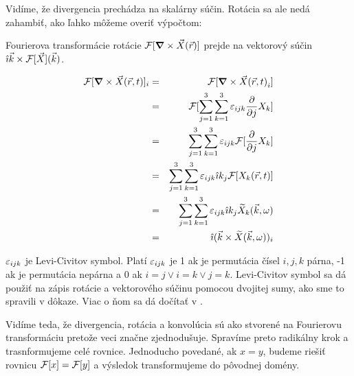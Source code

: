 Vidíme, že divergencia prechádza na skalárny súčin. Rotácia sa ale
nedá zahambiť, ako ľahko môžeme overiť výpočtom:


\begin{veta}
Fourierova transformácie rotácie 
$\mathcal{F}[\mbox{\boldmath$ \nabla $} \times \vec{X}(\vec{r})]$  prejde na vektorový súčin 
$ \hat{\imath} \vec{k} \times \mathcal{F}[\vec{X}](\vec{k})$.
\end{veta}

\begin{dokaz}
\begin{eqnarray*}
    \mathcal{F}[\mbox{\boldmath$ \nabla $} \times \vec{X}{(\vec{r},t)}]_i &=& 
    \mathcal{F}[\mbox{\boldmath$ \nabla $} \times \vec{X}{(\vec{r},t)}_i] \\
    &=& \mathcal{F}[\sum_{j=1}^3 \sum_{k=1}^3 \varepsilon_{ijk} \frac{\partial }{\partial j} X_k] \\
    &=& \sum_{j=1}^3 \sum_{k=1}^3 \varepsilon_{ijk} \mathcal{F}[\frac{\partial }{\partial j} X_k] \\
    &=& \sum_{j=1}^3 \sum_{k=1}^3 \varepsilon_{ijk} \hat{\imath} k_j \mathcal{F}[X_k{(\vec{r},t)}] \\
    &=& \sum_{j=1}^3 \sum_{k=1}^3 \varepsilon_{ijk} \hat{\imath} k_j \widetilde{X}_k {(\vec{k},\omega)} \\
    &=& \hat{\imath} ( \vec{k} \times \widetilde{X}{(\vec{k},\omega)} )_i
\end{eqnarray*} 
\end{dokaz}

\begin{poznamka}
$\varepsilon_{ijk}$ je Levi-Civitov symbol. Platí $\varepsilon_{ijk}$ je 1 ak je
permutácia čísel $i,j,k$ párna, -1 ak je permutácia nepárna a 0 ak
$i=j \lor i=k \lor j=k$. Levi-Civitov symbol sa dá použiť na zápis
rotácie a vektorového súčinu pomocou dvojitej sumy, ako sme to
spravili v dôkaze. Viac o ňom sa dá dočítať v \todo{}.
\end{poznamka}


Vidíme teda, že divergencia, rotácia a konvolúcia sú ako stvorené na
Fourierovu transformáciu pretože veci značne zjednodušuje. Spravíme
preto radikálny krok a trasnformujeme celé rovnice. Jednoducho
povedané, ak $x=y$, budeme riešiť rovnicu $\mathcal{F}[x]=\mathcal{F}[y]$ a
výsledok transformujeme do pôvodnej domény.


